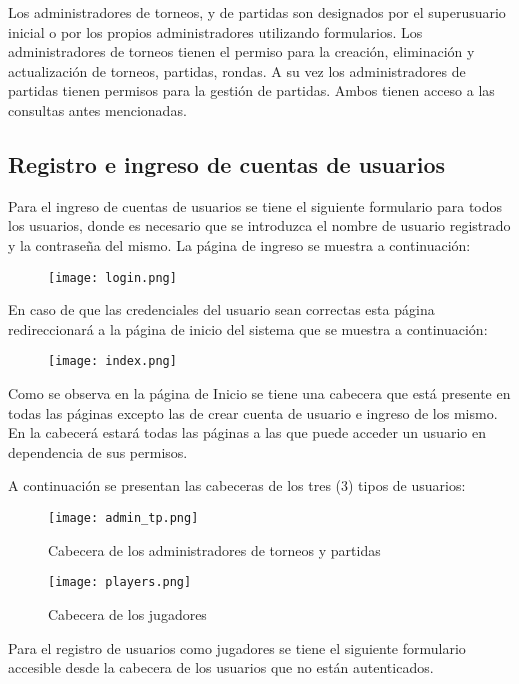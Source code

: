 \documentclass[12pt]{article}
\begin{document}
    Los administradores de torneos, y de partidas son designados por el superusuario inicial o por los propios administradores utilizando formularios. Los administradores de torneos tienen el permiso para la creación, eliminación y actualización de torneos, partidas, rondas. A su vez los administradores de partidas tienen permisos para la gestión de partidas. Ambos tienen acceso a las consultas antes mencionadas.

    \subsection{Registro e ingreso de cuentas de usuarios}

    Para el ingreso de cuentas de usuarios  se tiene el siguiente formulario para todos los usuarios, donde es necesario que se introduzca el nombre de usuario registrado y la contraseña del mismo. La página de ingreso se muestra a continuación:

\begin{figure}[h!]
    \centering
    \texttt{[image: login.png]}
\end{figure}
    
    En caso de que las credenciales del usuario sean correctas esta página redireccionará a la página de inicio del sistema que se muestra a continuación:

\begin{figure}[h!]
    \centering
    \texttt{[image: index.png]}
\end{figure}

Como se observa en la página de Inicio se tiene una cabecera que está presente en todas las páginas excepto las de crear cuenta de usuario e ingreso de los mismo. En la cabecerá estará todas las páginas a las que puede acceder un usuario en dependencia de sus permisos.

A continuación se presentan las cabeceras de los tres (3) tipos de usuarios:
\begin{figure}[h!]
    \centering
    \texttt{[image: admin\_tp.png]}
    \caption{Cabecera de los administradores de torneos y partidas}
\end{figure}
\begin{figure}[h!]
    \centering
    \texttt{[image: players.png]}
    \caption{Cabecera de los jugadores}
\end{figure}

Para el registro de usuarios como jugadores se tiene el siguiente formulario accesible desde la cabecera de los usuarios que no están autenticados.
\end{document}
